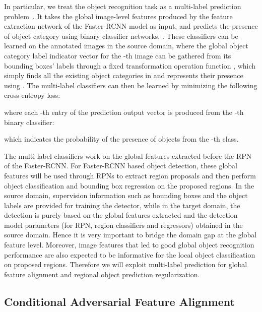 \documentclass[runningheads]{llncs}
\begin{document}
In particular, we treat the object recognition task as a multi-label prediction problem~\cite{zhang2006multilabel,gong2013deep}.
It takes the global image-level features produced by the feature extraction network 
of the Faster-RCNN model as input, and predicts the presence of  object category
using  binary classifier networks, .
These classifiers can be learned on the annotated images in the source domain,
where the global object category label indicator vector  for the -th image
can be gathered from its bounding boxes' labels  
through a fixed transformation operation function ,
which simply finds all the existing object categories in 
and represents their presence using .
The multi-label 
classifiers can then be learned by minimizing 
the following cross-entropy loss:

where each -th entry of the prediction output vector 
is produced from the -th binary classifier:

which indicates the probability of the presence of objects from the -th class. 



The multi-label classifiers work on the global features extracted before the RPN of the Faster-RCNN.
For Faster-RCNN based object detection, these global features will be used through RPNs
to extract region proposals and then perform object classification and bounding box regression on the proposed regions.
In the source domain, supervision information such as bounding boxes and the object labels are provided
for training the detector,
while in the target domain, the detection is 
purely based 
on the global features extracted and the detection model parameters (for RPN, region classifiers and regressors) 
obtained in the source domain.
Hence it is very important to bridge the domain gap at the global feature level.
Moreover, image features that led to good global object recognition performance
are also expected to be informative for the local object classification on proposed regions.
Therefore we will exploit multi-label prediction for global feature alignment
and regional object prediction regularization.


\subsection{Conditional Adversarial Feature Alignment}\label{3.2}
\end{document}
